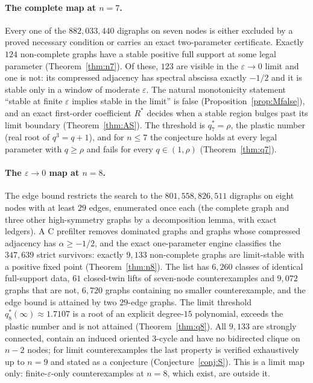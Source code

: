 \documentclass[11pt]{article}
\theoremstyle{definition}
\newcommand{\eps}{\varepsilon}
\begin{document}
\paragraph{The complete map at $n=7$.} Every one of the $882{,}033{,}440$ digraphs on seven nodes is either
excluded by a proved necessary condition or carries an exact two-parameter certificate. Exactly $124$
non-complete graphs have a stable positive full support at some legal parameter
(Theorem~\ref{thm:n7}). Of these, $123$ are visible in the $\eps\to0$ limit and one is not: its
compressed adjacency has spectral abscissa exactly $-1/2$ and it is stable only in a window of moderate
$\eps$. The natural monotonicity statement ``stable at finite $\eps$ implies stable in the limit'' is
false (Proposition~\ref{prop:Mfalse}), and an exact first-order coefficient $R^*$ decides when a stable
region bulges past its limit boundary (Theorem~\ref{thm:AS}). The threshold is $q_7^*=\rho$, the plastic
number (real root of $q^3=q+1$), and for $n\le7$ the conjecture holds at every legal parameter with
$q\ge\rho$ and fails for every $q\in(1,\rho)$ (Theorem~\ref{thm:q7}).

\paragraph{The $\eps\to0$ map at $n=8$.} The edge bound restricts the search to the $801{,}558{,}826{,}511$ digraphs on
eight nodes with at least $29$ edges, enumerated once each (the complete graph and three other high-symmetry graphs by a
decomposition lemma, with exact ledgers). A C prefilter removes dominated graphs and graphs whose compressed adjacency has
$\alpha\ge-1/2$, and the exact one-parameter engine classifies the $347{,}639$ strict survivors: exactly $9{,}133$
non-complete graphs are limit-stable with a positive fixed point (Theorem~\ref{thm:n8}). The list has $6{,}260$ classes of
identical full-support data, $61$ closed-twin lifts of seven-node counterexamples and $9{,}072$ graphs that are not,
$6{,}720$ graphs containing no smaller counterexample, and the edge bound is attained by two $29$-edge graphs. The limit
threshold $q_8^*(\infty)\approx1.7107$ is a root of an explicit degree-$15$ polynomial, exceeds the plastic number and is not
attained (Theorem~\ref{thm:q8}). All $9{,}133$ are strongly connected, contain an induced oriented $3$-cycle and have no
bidirected clique on $n-2$ nodes; for limit counterexamples the last property is verified exhaustively up to $n=9$ and stated as a conjecture
(Conjecture~\ref{conj:S}). This is a limit map only: finite-$\eps$-only counterexamples at $n=8$, which exist, are
outside it.
\end{document}
